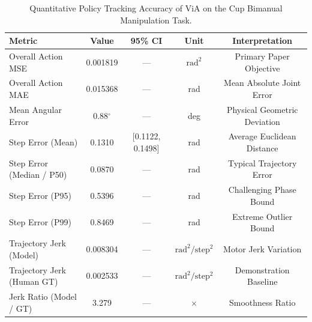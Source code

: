 \begin{table}[t]
\centering
\caption{Quantitative Policy Tracking Accuracy of ViA on the Cup Bimanual Manipulation Task.}
\label{tab:policy_accuracy}
\begin{tabular}{lcccc}
\toprule
\textbf{Metric} & \textbf{Value} & \textbf{95\% CI} & \textbf{Unit} & \textbf{Interpretation} \\
\midrule
Overall Action MSE & 0.001819 & --- & $\text{rad}^2$ & Primary Paper Objective \\
Overall Action MAE & 0.015368 & --- & rad & Mean Absolute Joint Error \\
Mean Angular Error & 0.88$^\circ$ & --- & deg & Physical Geometric Deviation \\
Step Error (Mean) & 0.1310 & [0.1122, 0.1498] & rad & Average Euclidean Distance \\
Step Error (Median / P50) & 0.0870 & --- & rad & Typical Trajectory Error \\
Step Error (P95) & 0.5396 & --- & rad & Challenging Phase Bound \\
Step Error (P99) & 0.8469 & --- & rad & Extreme Outlier Bound \\
Trajectory Jerk (Model) & 0.008304 & --- & $\text{rad}^2/\text{step}^2$ & Motor Jerk Variation \\
Trajectory Jerk (Human GT) & 0.002533 & --- & $\text{rad}^2/\text{step}^2$ & Demonstration Baseline \\
Jerk Ratio (Model / GT) & 3.279 & --- & $\times$ & Smoothness Ratio \\
\bottomrule
\end{tabular}
\end{table}
